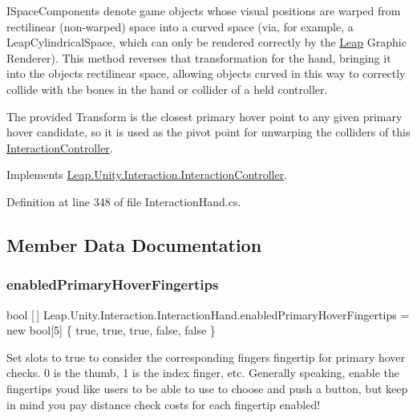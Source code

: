 I\+Space\+Components denote game objects whose visual positions are warped from rectilinear (non-\/warped) space into a curved space (via, for example, a Leap\+Cylindrical\+Space, which can only be rendered correctly by the \mbox{\hyperlink{namespace_leap_1_1_unity_1_1_leap}{Leap}} Graphic Renderer). This method reverses that transformation for the hand, bringing it into the object\textquotesingle{}s rectilinear space, allowing objects curved in this way to correctly collide with the bones in the hand or collider of a held controller.

The provided Transform is the closest primary hover point to any given primary hover candidate, so it is used as the pivot point for unwarping the colliders of this \mbox{\hyperlink{class_leap_1_1_unity_1_1_interaction_1_1_interaction_controller}{Interaction\+Controller}}. 

Implements \mbox{\hyperlink{class_leap_1_1_unity_1_1_interaction_1_1_interaction_controller_aef6aebf580bed0a675b59e1c4a267376}{Leap.\+Unity.\+Interaction.\+Interaction\+Controller}}.



Definition at line 348 of file Interaction\+Hand.\+cs.



\subsection{Member Data Documentation}
\mbox{\label{class_leap_1_1_unity_1_1_interaction_1_1_interaction_hand_a09719682ae423b8b6d52d12a81a1b05c}} 
\subsubsection{\texorpdfstring{enabledPrimaryHoverFingertips}{enabledPrimaryHoverFingertips}}
{\footnotesize\ttfamily bool \mbox{[}$\,$\mbox{]} Leap.\+Unity.\+Interaction.\+Interaction\+Hand.\+enabled\+Primary\+Hover\+Fingertips = new bool\mbox{[}5\mbox{]} \{ true, true, true, false, false \}}



Set slots to true to consider the corresponding finger\textquotesingle{}s fingertip for primary hover checks. 0 is the thumb, 1 is the index finger, etc. Generally speaking, enable the fingertips you\textquotesingle{}d like users to be able to use to choose and push a button, but keep in mind you pay distance check costs for each fingertip enabled! 



